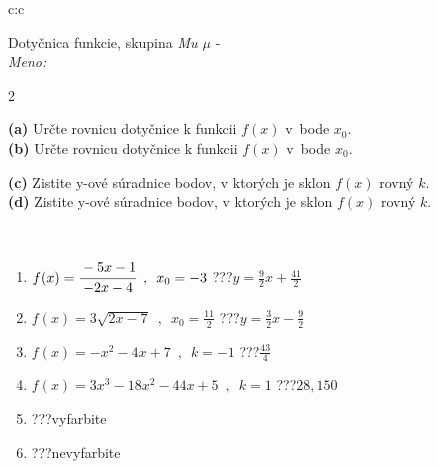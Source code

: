 \documentclass[10pt]{report}
\begin{document}
\begin{tabular}{c:c}
\begin{minipage}[c][104.5mm][t]{0.5\linewidth}
\begin{center}
\vspace{7mm}
{\huge Dotyčnica funkcie, skupina \textit{Mu $\mu$} -}\\[5mm]
\textit{Meno:}\phantom{xxxxxxxxxxxxxxxxxxxxxxxxxxxxxxxxxxxxxxxxxxxxxxxxxxxxxxxxxxxxxxxxx}\\[5mm]
\begin{minipage}{0.95\linewidth}
\begin{center}
{\small \begin{multicols}{2} \raggedright
\textbf{(a)} Určte rovnicu dotyčnice k funkcii \(f(x)\) v~bode \(x_0\). \\[1mm]
\textbf{(b)} Určte rovnicu dotyčnice k funkcii \(f(x)\) v~bode \(x_0\). \par \columnbreak
\textbf{(c)} Zistite y-ové súradnice bodov, v ktorých je sklon \(f(x)\) rovný \(k\). \\[1mm]
\textbf{(d)} Zistite y-ové súradnice bodov, v ktorých je sklon \(f(x)\) rovný \(k\). \\[1mm]
\end{multicols}
}
\end{center}
\end{minipage}
\\[4mm]
\begin{minipage}{0.79\linewidth}
\begin{center}
\begin{varwidth}{\linewidth}
\begin{enumerate}
\normalsizerr
\item $f(x)=\cfrac{-5x-1}{-2x-4}\enspace , \enspace x_0=-3$\quad \dotfill\; ???\;\dotfill \quad $y = \frac{9}{2}x+\frac{41}{2}$
\item $f(x)=3\sqrt{2x-7}\enspace , \enspace x_0=\frac{11}{2}$\quad \dotfill\; ???\;\dotfill \quad $y = \frac{3}{2}x-\frac{9}{2}$
\item $f(x)=-x^2-4x+7\enspace , \enspace k=-1$\quad \dotfill\; ???\;\dotfill \quad $\frac{43}{4}$
\item $f(x)=3x^3-18x^2-44x+5\enspace , \enspace k=1$\quad \dotfill\; ???\;\dotfill \quad $28 , 150$
\item \quad \dotfill\; ???\;\dotfill \quad vyfarbite
\item \quad \dotfill\; ???\;\dotfill \quad nevyfarbite
\end{enumerate}
\end{varwidth}

\end{center}
\end{minipage}
\end{center}
\end{minipage}
\end{tabular}
\end{document}
